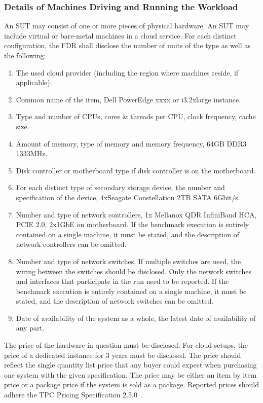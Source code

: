 \subsubsection{Details of Machines Driving and Running the Workload}
An SUT may consist of one or more pieces of physical hardware. An SUT may include virtual or bare-metal machines in a cloud service.
For each distinct configuration, the FDR shall disclose the number of units of the type as well as the following:

\begin{enumerate}
    \item The used cloud provider (including the region where machines reside, if applicable).
    \item Common name of the item, \eg Dell PowerEdge xxxx or i3.2xlarge instance.
    \item Type and number of CPUs, cores \& threads per CPU, clock frequency, cache size.
    \item Amount of memory, type of memory and memory frequency, \eg 64GB DDR3 1333MHz.
    \item Disk controller or motherboard type if disk controller is on the motherboard.
    \item For each distinct type of secondary storage device, the number and specification of the device, \eg 4xSeagate Constellation 2TB SATA 6Gbit/s.
    \item Number and type of network controllers, \eg 1x Mellanox QDR InfiniBand HCA, PCIE 2.0, 2x1GbE on motherboard. If the benchmark execution is entirely contained on a single machine, it must be stated, and the description of network controllers can be omitted.
    \item Number and type of network switches. If multiple switches are used, the wiring between the switches should be disclosed.
    Only the network switches and interfaces that participate in the run need to be reported. If the benchmark execution is entirely contained on a single machine, it must be stated, and the description of network switches can be omitted.
    \item Date of availability of the system as a whole, \ie the latest date of availability of any part.
\end{enumerate}

The price of the hardware in question must be disclosed. For cloud setups, the price of a dedicated instance for 3 years must be disclosed. The price should reflect the single quantity list price that any buyer could expect when purchasing one system with the given specification. The price may be either an item by item price or a package price if the system is sold as a package.
Reported prices should adhere the TPC Pricing Specification 2.5.0~\cite{pricing,tpc-pricing}.

